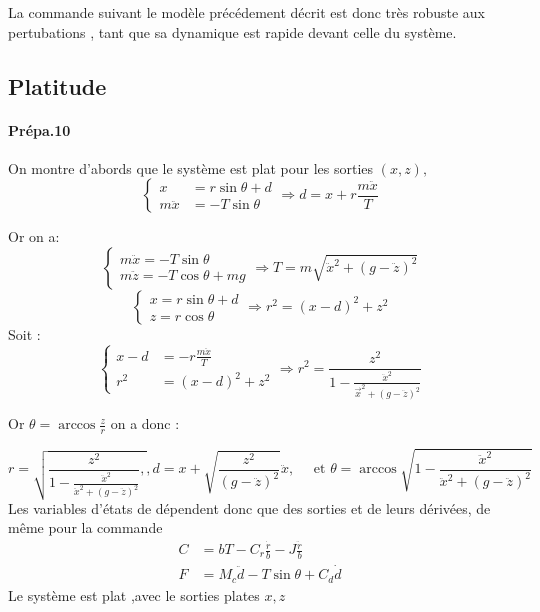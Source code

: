 \documentclass[10pt,a4paper,notitlepage]{article}
\renewcommand{\vec}{\overrightarrow}
\begin{document}
La commande suivant le modèle précédement décrit est donc très robuste
aux pertubations , tant que sa dynamique est rapide devant celle du système.

\subsection{Platitude}
\paragraph{Prépa.10}
On montre d'abords que le système est plat pour les sorties $(x, z),$
\begin{equation}
  \left\{
    \begin{aligned}
      x &=r \sin \theta+d \\
      m \ddot{x} &=-T \sin \theta
    \end{aligned}
  \right. \Rightarrow d=x+r \frac{m \ddot{x}}{T}
\end{equation}

Or on a:
\begin{equation}
  \begin{cases}
    m \ddot{x}=-T \sin \theta \\
    m \ddot{z}=-T \cos \theta+m g
  \end{cases} \Rightarrow T=m \sqrt{\ddot{x}^{2}+(g-\ddot{z})^{2}}
\end{equation}
\begin{equation}
  \begin{cases}
    x=r \sin \theta+d \\
    z=r \cos \theta
  \end{cases} \Rightarrow r^{2}=(x-d)^{2}+z^{2}
\end{equation}
Soit :
\begin{equation}
  \begin{cases}
    x-d &=-r \frac{m \ddot{x}}{T} \\
    r^{2} &=(x-d)^{2}+z^{2}
  \end{cases} \Rightarrow r^{2}=\frac{z^{2}}{1-\frac{\ddot{x}^{2}}{\vec{x}^{2}+(g-\ddot{z})^{2}}}
\end{equation}

Or $\theta = \arccos{\frac{z}{r}}$ on a donc :

\begin{equation}
r=\sqrt{\frac{z^{2}}{1-\frac{\ddot{x}^{2}}{\ddot{x}^{2}+(g-\ddot{z})^{2}}},}, d=x+\sqrt{\frac{z^{2}}{(g-\ddot{z})^{2}}} \ddot{x}, \quad \text { et } \theta=\arccos \sqrt{1-\frac{\ddot{x}^{2}}{\ddot{x}^{2}+(g-\ddot{z})^{2}}}
\end{equation}
Les variables d'états de dépendent donc que des sorties et de leurs dérivées, de même pour la commande 
\begin{equation}
  \begin{aligned}
    C &=b T-C_{r} \frac{\dot{r}}{b}-J \frac{\ddot{r}}{b} \\
    F &=M_{c} \ddot{d}-T \sin \theta+C_{d} \dot{d}
  \end{aligned}
\end{equation}
Le système est plat ,avec le sorties  plates $x,z$
\end{document}
